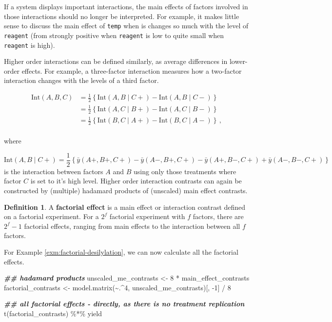 \documentclass[
]{book}
\newenvironment{Shaded}{\begin{snugshade}}{\end{snugshade}}
\newcommand{\DecValTok}[1]{\textcolor[rgb]{0.00,0.00,0.81}{#1}}
\newcommand{\DocumentationTok}[1]{\textcolor[rgb]{0.56,0.35,0.01}{\textbf{\textit{#1}}}}
\newcommand{\FunctionTok}[1]{\textcolor[rgb]{0.00,0.00,0.00}{#1}}
\newcommand{\NormalTok}[1]{#1}
\newcommand{\OtherTok}[1]{\textcolor[rgb]{0.56,0.35,0.01}{#1}}
\newcommand{\SpecialCharTok}[1]{\textcolor[rgb]{0.00,0.00,0.00}{#1}}
\theoremstyle{definition}
\newtheorem{definition}{Definition}[chapter]
\theoremstyle{definition}
\theoremstyle{definition}
\theoremstyle{definition}
\theoremstyle{remark}
\begin{document}
If a system displays important interactions, the main effects of factors involved in those interactions should no longer be interpreted. For example, it makes little sense to discuss the main effect of \texttt{temp} when is changes so much with the level of \texttt{reagent} (from strongly positive when \texttt{reagent} is low to quite small when \texttt{reagent} is high).

Higher order interactions can be defined similarly, as average differences in lower-order effects. For example, a three-factor interaction measures how a two-factor interaction changes with the levels of a third factor.

\begin{align*}
\mbox{Int}(A, B, C) & = \frac{1}{2}\left\{\mbox{Int}(A, B \mid C+) - \mbox{Int}(A, B \mid C-)\right\} \\
& = \frac{1}{2}\left\{\mbox{Int}(A, C \mid B+) - \mbox{Int}(A, C \mid B-)\right\} \\
& = \frac{1}{2}\left\{\mbox{Int}(B, C \mid A+) - \mbox{Int}(B, C \mid A-)\right\}\,, \\
\end{align*}

where

\[
\mbox{Int}(A, B \mid C+) = \frac{1}{2}\left\{\bar{y}(A+, B+, C+) - \bar{y}(A-, B+, C+) - \bar{y}(A+, B-, C+) + \bar{y}(A-, B-, C+)\right\}
\]
is the interaction between factors \(A\) and \(B\) using only those treatments where factor \(C\) is set to it's high level. Higher order interaction contrasts can again be constructed by (multiple) hadamard products of (unscaled) main effect contrasts.

\begin{definition}
\protect\hypertarget{def:factorial-effects}{}\label{def:factorial-effects}A \textbf{factorial effect} is a main effect or interaction contrast defined on a factorial experiment. For a \(2^f\) factorial experiment with \(f\) factors, there are \(2^f-1\) factorial effects, ranging from main effects to the interaction between all \(f\) factors.
\end{definition}

For Example \ref{exm:factorial-desilylation}, we can now calculate all the factorial effects.

\begin{Shaded}
\begin{Highlighting}[]
\DocumentationTok{\#\# hadamard products}
\NormalTok{unscaled\_me\_contrasts }\OtherTok{\textless{}{-}} \DecValTok{8} \SpecialCharTok{*}\NormalTok{ main\_effect\_contrasts}
\NormalTok{factorial\_contrasts }\OtherTok{\textless{}{-}} \FunctionTok{model.matrix}\NormalTok{(}\SpecialCharTok{\textasciitilde{}}\NormalTok{.}\SpecialCharTok{\^{}}\DecValTok{4}\NormalTok{, unscaled\_me\_contrasts)[, }\SpecialCharTok{{-}}\DecValTok{1}\NormalTok{] }\SpecialCharTok{/} \DecValTok{8}

\DocumentationTok{\#\# all factorial effects {-} directly, as there is no treatment replication}
\FunctionTok{t}\NormalTok{(factorial\_contrasts) }\SpecialCharTok{\%*\%}\NormalTok{ yield}
\end{Highlighting}
\end{Shaded}
\end{document}
